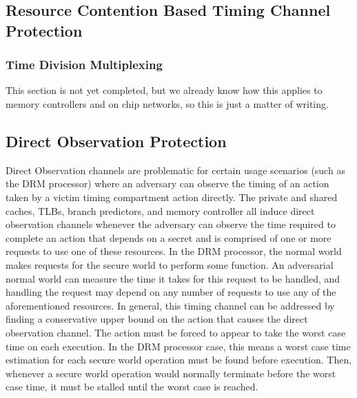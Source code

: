 \subsection{Resource Contention Based Timing Channel Protection}
\subsubsection{Time Division Multiplexing}
This section is not yet completed, but we already know how this applies to 
memory controllers and on chip networks, so this is just a matter of writing.

\subsection{Direct Observation Protection}
Direct Observation channels are problematic for certain usage scenarios (such 
as the DRM processor) where an adversary can observe the timing of an action 
taken by a victim timing compartment action directly.  The private and shared 
caches, TLBs, branch predictors, and memory controller all induce direct 
observation channels whenever the adversary can observe the time required to 
complete an action that depends on a secret and is comprised of one or more 
requests to use one of these resources.  In the DRM processor, the normal world 
makes requests for the secure world to perform some function. An adversarial 
normal world can measure the time it takes for this request to be handled, and 
handling the request may depend on any number of requests to use any of the 
aforementioned resources. In general, this timing channel can be addressed by 
finding a conservative upper bound on the action that causes the direct 
observation channel. The action must be forced to appear to take the worst case 
time on each execution. In the DRM processor case, this means a worst case time 
estimation for each secure world operation must be found before execution. 
Then, whenever a secure world operation would normally terminate before the 
worst case time, it must be stalled until the worst case is reached.
